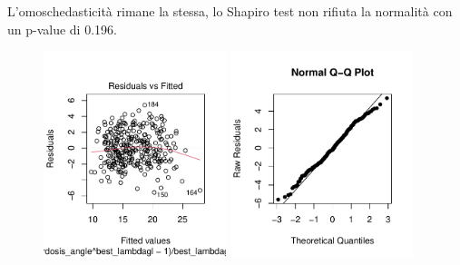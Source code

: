 \documentclass{beamer}
\begin{document}
\begin{frame}
	L'omoschedasticità rimane la stessa, lo Shapiro test non rifiuta la normalità con un p-value di 0.196.
	\begin{figure}
	   \includegraphics[width=0.475\textwidth]{10omoschedasticita}
	   \hfill
	   \includegraphics[width=0.475\textwidth]{11qqplot}
	\end{figure}
\end{frame}
\end{document}
